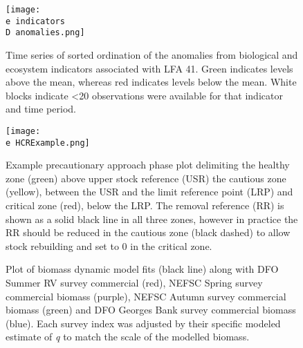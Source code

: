 \documentclass[11pt]{article}
\newcommand{\D}{.}
\newcommand{\e}{/backup/bio_data/bio.lobster/figures/} %
\newcommand{\spm}{/backup/bio_data/bio.lobster/spmodelling/lfa41/}
\begin{document}
\begin{figure}

    \texttt{[image: \\e indicators\\D anomalies.png]}
    
    \caption{Time series of sorted ordination of the anomalies from biological and ecosystem indicators associated with LFA 41. Green indicates levels above the mean, whereas red indicates levels below the mean. White blocks indicate \textless 20 observations were available for that indicator and time period.}

\end{figure}





\begin{figure}
\centering
    \texttt{[image: \\e HCRExample.png]}
    \caption{Example precautionary approach phase plot delimiting the healthy zone (green) above upper stock reference (USR) the cautious zone (yellow), between the USR and the limit reference point (LRP) and critical zone (red), below the LRP. The removal reference (RR) is shown as a solid black line in all three zones, however in practice the RR should be reduced in the cautious zone (black dashed) to allow stock rebuilding and set to 0 in the critical zone.
}

\end{figure}



\begin{figure}
\centering
        \caption{Plot of biomass dynamic model fits (black line) along with DFO Summer RV survey commercial (red), NEFSC Spring survey commercial biomass (purple), NEFSC Autumn survey commercial biomass (green) and DFO Georges Bank survey commercial biomass (blue). Each survey index was adjusted by their specific modeled estimate of \emph{q} to match the scale of the modelled biomass.}


\end{figure}
\end{document}
